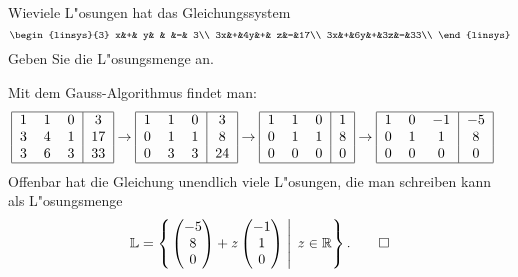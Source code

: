 Wieviele L"osungen hat das Gleichungssystem
\[
\begin{linsys}{3}
 x&+& y& &  &=& 3\\
3x&+&4y&+& z&=&17\\
3x&+&6y&+&3z&=&33\\
\end{linsys}
\]
Geben Sie die L"osungsmenge an.

\begin{loesung}
Mit dem Gauss-Algorithmus findet man:
\begin{align*}
\begin{tabular}{|ccc|c|}
\hline
1&1&0& 3\\
3&4&1&17\\
3&6&3&33\\
\hline
\end{tabular}
&\rightarrow
\begin{tabular}{|ccc|c|}
\hline
1&1&0& 3\\
0&1&1& 8\\
0&3&3&24\\
\hline
\end{tabular}
\rightarrow
\begin{tabular}{|ccc|c|}
\hline
1&1&0&1\\
0&1&1&8\\
0&0&0&0\\
\hline
\end{tabular}
\rightarrow
\begin{tabular}{|ccc|c|}
\hline
1&0&$-1$&$-5$\\
0&1&1&8\\
0&0&0&0\\
\hline
\end{tabular}
\end{align*}
Offenbar hat die Gleichung unendlich viele L"osungen,
die man schreiben kann als
L"osungsmenge
\[
\mathbb L=
\left\{
\left.
\begin{pmatrix}-5\\8\\0\end{pmatrix}+z\begin{pmatrix}-1\\1\\0\end{pmatrix}\;\right|\;z\in\mathbb R
\right\}.
\qedhere
\]
\end{loesung}

